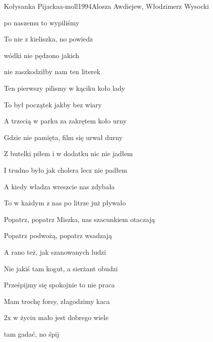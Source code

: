 \documentclass[a4paper,draft]{book}
\begin{document}
\begin{song}{Kołysanka Pijacka}{a-moll}{1994}{Alosza Awdiejew, Włodzimerz Wysocki}{}{}
	\begin{SBVerse}
	 po naszemu to wypiliśmy 

	To nie z kieliszka, no powiedz  

	 wódki nie pędzono jakich 

	 nie zaszkodziłby nam ten literek 
	\end{SBVerse}
	\begin{SBVerse}
	Ten pierwszy pilismy w kąciku koło lady

	To był początek jakby bez wiary

	A trzecią w parku za zakrętem koło urny

	Gdzie nie pamięta, film się urwał durny
	\end{SBVerse}
	\begin{SBVerse}
	Z butelki piłem i w dodatku nic nie jadłem

	I trudno było jak cholera lecz nie padłem

	A kiedy władza wreszcie nas zdybała

	To w każdym z nas po litrze już pływało
	\end{SBVerse}
	\begin{SBVerse}
	Popatrz, popatrz Miszka, nas szacunkiem otaczają

	Popatrz podwożą, popatrz wsadzają

	A rano też, jak szanowanych ludzi

	Nie jakiś tam kogut, a sierżant obudzi
	\end{SBVerse}
	\begin{SBVerse}
	Prześpijmy się spokojnie to nie praca

	Mam trochę forsy, złagodzimy kaca
	\end{SBVerse}
	\begin{SBBracket}{2x}
	 w życiu mało jest dobrego wiele 

	 tam gadać, no śpij  
	\end{SBBracket}
\end{song}
\end{document}
